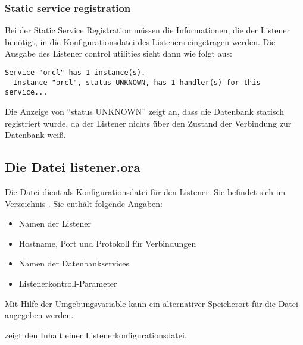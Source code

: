         \subsubsection{Static service registration}
          Bei der Static Service Registration müssen die Informationen, die der Listener benötigt, in die Konfigurationsdatei des Listeners eingetragen werden. Die Ausgabe des Listener control utilities sieht dann wie folgt aus:
          \begin{lstlisting}[caption={Statische Registrierung},label=admin601,language=terminal]
Service "orcl" has 1 instance(s).
  Instance "orcl", status UNKNOWN, has 1 handler(s) for this service...
          \end{lstlisting}
          Die Anzeige von \enquote{status UNKNOWN} zeigt an, dass die Datenbank statisch registriert wurde, da der Listener nichts über den Zustand der Verbindung zur Datenbank weiß.
      \subsection{Die Datei listener.ora}
        Die Datei  dient als Konfigurationsdatei für den Listener. Sie befindet sich im Verzeichnis . Sie enthält folgende Angaben:
        \begin{itemize}
          \item Namen der Listener
          \item Hostname, Port und Protokoll für Verbindungen
          \item Namen der Datenbankservices
          \item Listenerkontroll-Parameter
        \end{itemize}
        \begin{merke}
          Mit Hilfe der Umgebungsvariable  kann ein alternativer Speicherort für die Datei  angegeben werden.
        \end{merke}
         zeigt den Inhalt einer Listenerkonfigurationsdatei.

